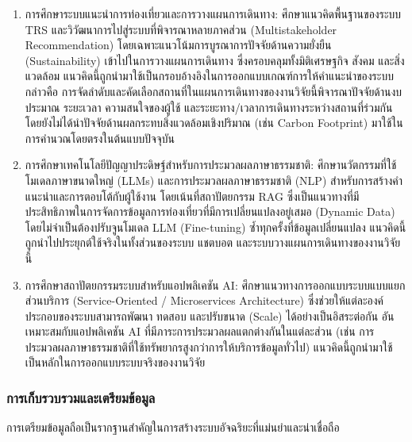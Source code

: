 \begin{enumerate}[label=(\arabic*),leftmargin=0pt,itemindent=\dimexpr\parindent+\parenlabelwidth+1em\relax,align=right,labelwidth=\parenlabelwidth,labelsep=1em]
\item การศึกษาระบบแนะนำการท่องเที่ยวและการวางแผนการเดินทาง: ศึกษาแนวคิดพื้นฐานของระบบ TRS และวิวัฒนาการไปสู่ระบบที่พิจารณาหลายภาคส่วน (Multistakeholder Recommendation) โดยเฉพาะแนวโน้มการบูรณาการปัจจัยด้านความยั่งยืน (Sustainability) เข้าไปในการวางแผนการเดินทาง ซึ่งครอบคลุมทั้งมิติเศรษฐกิจ สังคม และสิ่งแวดล้อม แนวคิดนี้ถูกนำมาใช้เป็นกรอบอ้างอิงในการออกแบบเกณฑ์การให้คำแนะนำของระบบ กล่าวคือ การจัดลำดับและคัดเลือกสถานที่ในแผนการเดินทางของงานวิจัยนี้พิจารณาปัจจัยด้านงบประมาณ ระยะเวลา ความสนใจของผู้ใช้ และระยะทาง/เวลาการเดินทางระหว่างสถานที่ร่วมกัน โดยยังไม่ได้นำปัจจัยด้านผลกระทบสิ่งแวดล้อมเชิงปริมาณ (เช่น Carbon Footprint) มาใช้ในการคำนวณโดยตรงในต้นแบบปัจจุบัน
\item การศึกษาเทคโนโลยีปัญญาประดิษฐ์สำหรับการประมวลผลภาษาธรรมชาติ: ศึกษานวัตกรรมที่ใช้โมเดลภาษาขนาดใหญ่ (LLMs) และการประมวลผลภาษาธรรมชาติ (NLP) สำหรับการสร้างคำแนะนำและการตอบโต้กับผู้ใช้งาน โดยเน้นที่สถาปัตยกรรม RAG ซึ่งเป็นแนวทางที่มีประสิทธิภาพในการจัดการข้อมูลการท่องเที่ยวที่มีการเปลี่ยนแปลงอยู่เสมอ (Dynamic Data) โดยไม่จำเป็นต้องปรับจูนโมเดล LLM (Fine-tuning) ซ้ำทุกครั้งที่ข้อมูลเปลี่ยนแปลง แนวคิดนี้ถูกนำไปประยุกต์ใช้จริงในทั้งส่วนของระบบ แชตบอต และระบบวางแผนการเดินทางของงานวิจัยนี้
\item การศึกษาสถาปัตยกรรมระบบสำหรับแอปพลิเคชัน AI: ศึกษาแนวทางการออกแบบระบบแบบแยกส่วนบริการ (Service-Oriented / Microservices Architecture) ซึ่งช่วยให้แต่ละองค์ประกอบของระบบสามารถพัฒนา ทดสอบ และปรับขนาด (Scale) ได้อย่างเป็นอิสระต่อกัน อันเหมาะสมกับแอปพลิเคชัน AI ที่มีภาระการประมวลผลแตกต่างกันในแต่ละส่วน (เช่น การประมวลผลภาษาธรรมชาติที่ใช้ทรัพยากรสูงกว่าการให้บริการข้อมูลทั่วไป) แนวคิดนี้ถูกนำมาใช้เป็นหลักในการออกแบบระบบจริงของงานวิจัย
\end{enumerate}

\subsubsection{การเก็บรวบรวมและเตรียมข้อมูล}

การเตรียมข้อมูลถือเป็นรากฐานสำคัญในการสร้างระบบอัจฉริยะที่แม่นยำและน่าเชื่อถือ

